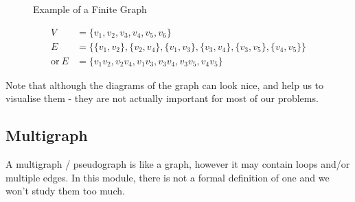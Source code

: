 \begin{minipage}{0.3\textwidth}
    \begin{figure}[H]
        \centering
        \caption{Example of a Finite Graph}
    \end{figure}
\end{minipage} \hfill
\begin{minipage}{0.65\textwidth}
\begin{align*}
    V &= \{v_1, v_2, v_3, v_4, v_5, v_6\} \\
    E &= \{\{v_1, v_2\}, \{v_2, v_4\}, \{v_1, v_3\}, \{v_3, v_4\}, \{v_3, v_5\}, \{v_4, v_5\}\} \\
    \mathrm{or\ } E &= \{v_1v_2, v_2v_4, v_1v_3, v_3v_4, v_3v_5, v_4v_5\}
\end{align*}
\end{minipage}

Note that although the diagrams of the graph can look nice, and help us to visualise them - they are not actually important for most of our problems.

\subsection{Multigraph}
A multigraph / pseudograph is like a graph, however it may contain loops and/or multiple edges. In this module, there is not a formal definition of one and we won't study them too much.

